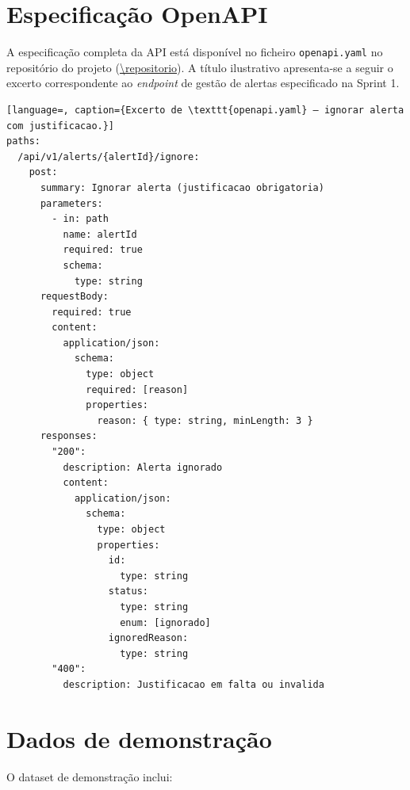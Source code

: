 
\chapter{Especificação OpenAPI}
\label{anexo:openapi}


A especificação completa da API está disponível no ficheiro
\texttt{openapi.yaml} no repositório do projeto
(\url{\repositorio}). A título ilustrativo apresenta-se a seguir
o excerto correspondente ao \emph{endpoint} de gestão de alertas
especificado na Sprint 1.

\begin{lstlisting}[language=, caption={Excerto de \texttt{openapi.yaml} — ignorar alerta com justificacao.}]
paths:
  /api/v1/alerts/{alertId}/ignore:
    post:
      summary: Ignorar alerta (justificacao obrigatoria)
      parameters:
        - in: path
          name: alertId
          required: true
          schema:
            type: string
      requestBody:
        required: true
        content:
          application/json:
            schema:
              type: object
              required: [reason]
              properties:
                reason: { type: string, minLength: 3 }
      responses:
        "200":
          description: Alerta ignorado
          content:
            application/json:
              schema:
                type: object
                properties:
                  id:
                    type: string
                  status:
                    type: string
                    enum: [ignorado]
                  ignoredReason:
                    type: string
        "400":
          description: Justificacao em falta ou invalida
\end{lstlisting}


\chapter{Dados de demonstração}
\label{anexo:dados}


O dataset de demonstração inclui:

